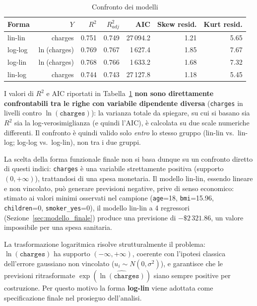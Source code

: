 \documentclass[11pt,a4paper]{article}
\begin{document}
\begin{table}[H]
\centering
\caption{Confronto dei modelli}
\label{tab:forme_funzionali}
\begin{tabular}{lrrrrrr}
\toprule
Forma & $Y$ & $R^2$ & $R^2_{adj}$ & AIC & Skew resid. & Kurt resid. \\
\midrule
lin-lin & charges       & 0.751 & 0.749 & 27\,094.2 & 1.21 & 5.65 \\
log-log & $\ln$(charges) & 0.769 & 0.767 & 1\,627.4  & 1.85 & 7.67 \\
log-lin & $\ln$(charges) & 0.768 & 0.766 & 1\,633.2  & 1.68 & 7.32 \\
lin-log & charges       & 0.744 & 0.743 & 27\,127.8 & 1.18 & 5.45 \\
\bottomrule
\end{tabular}
\end{table}

I valori di $R^2$ e AIC riportati in Tabella~\ref{tab:forme_funzionali}
\textbf{non sono direttamente confrontabili tra le righe con variabile
dipendente diversa} (\texttt{charges} in livelli contro
$\ln(\texttt{charges})$): la varianza totale da spiegare, su cui si basano
sia $R^2$ sia la log-verosimiglianza (e quindi l'AIC), è calcolata su due
scale numeriche differenti. Il confronto è quindi valido solo \emph{entro}
lo stesso gruppo (lin-lin vs.\ lin-log; log-log vs.\ log-lin), non tra i
due gruppi.

La scelta della forma funzionale finale non si basa dunque su un confronto
diretto di questi indici:
\texttt{charges} è una variabile strettamente positiva (supporto
$(0,+\infty)$), trattandosi di una spesa monetaria. Il modello lin-lin,
essendo lineare e non vincolato, può generare previsioni negative, prive
di senso economico: stimato ai valori minimi osservati nel campione
(\texttt{age}=18, \texttt{bmi}=15.96, \texttt{children}=0,
\texttt{smoker\_yes}=0), il modello lin-lin a 4 regressori
(Sezione~\ref{sec:modello_finale}) produce una previsione di
$-\$2\,321.86$, un valore impossibile per una spesa sanitaria.

La trasformazione logaritmica risolve strutturalmente il problema:
$\ln(\texttt{charges})$ ha supporto $(-\infty,+\infty)$, coerente con
l'ipotesi classica dell'errore gaussiano non vincolato
($u_i\sim N(0,\sigma^2)$), e garantisce che le previsioni ritrasformate
$\exp(\widehat{\ln(\texttt{charges})})$ siano sempre positive per
costruzione. Per questo motivo la forma \textbf{log-lin} viene adottata
come specificazione finale nel prosieguo dell'analisi.
\end{document}
